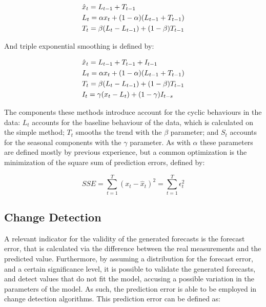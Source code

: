 \begin {equation*}
\centering
\begin {split}
&\hat{x}_t = L_{t-1} + T_{t-1} \\
&L_t = \alpha x_t + (1-\alpha)(L_{t-1} + T_{t-1}) \\
&T_t = \beta (L_t - L_{t-1}) + (1-\beta)T_{t-1}
\end {split}
\label{eq:exp_smooth}
\end {equation*}

\par And triple exponential smoothing is defined by:

\begin {equation*}
\centering
\begin {split}
&\hat{x}_t = L_{t-1} + T_{t-1} + I_{t-1}\\
&L_t = \alpha x_t + (1-\alpha)(L_{t-1} + T_{t-1}) \\
&T_t = \beta (L_t - L_{t-1}) + (1-\beta)T_{t-1} \\
&I_t = \gamma (x_t - L_t) + (1-\gamma)I_{t-s}
\end {split}
\label{eq:exp_smooth}
\end {equation*}

\par The components these methods introduce account for the cyclic behaviours in the data: $L_t$ accounts for the baseline behaviour of the data, which is calculated on the simple method; $T_t$ smooths the trend with the $\beta$ 
parameter; and $S_t$ accounts for the seasonal components with the $\gamma$ parameter. As with $\alpha$ these parameters are defined mostly by previous experience, but a common optimization is the minimization of the square sum 
of prediction errors, defined by:

\begin {equation*}
SSE = \sum_{t=1}^T{(x_t-\hat{x}_{t})^2} = \sum_{t=1}^T{\epsilon_t^2}
\end {equation*}

\subsection {Change Detection}

A relevant indicator for the validity of the generated forecasts is the forecast error, that is calculated via the difference between the real measurements and the predicted value. Furthermore, by assuming a distribution for 
the forecast error, and a certain significance level, it is possible to validate the generated forecasts, and detect values that do not fit the model, accusing a possible variation in the parameters of the model. As such,
the prediction error is able to be employed in change detection algorithms. This prediction error can be defined as:

